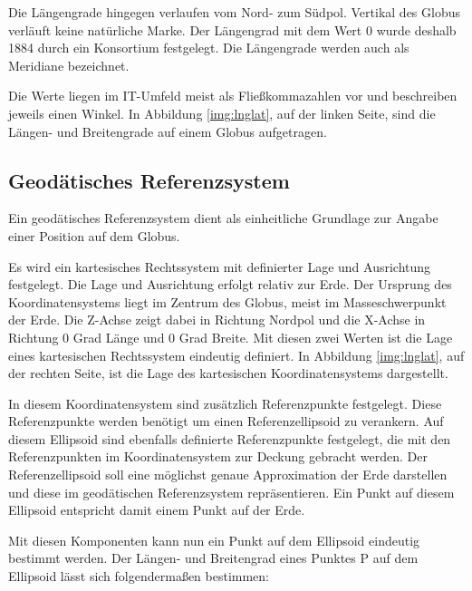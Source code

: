 			Die Längengrade hingegen verlaufen vom Nord- zum Südpol. 
			Vertikal des Globus verläuft keine natürliche Marke. 
			Der Längengrad mit dem Wert 0 wurde deshalb 1884 durch ein Konsortium festgelegt.
			Die Längengrade werden auch als Meridiane bezeichnet.
			
			Die Werte liegen im IT-Umfeld meist als Fließkommazahlen vor und beschreiben jeweils einen Winkel.
			In Abbildung \ref{img:lnglat}, auf der linken Seite, sind die Längen- und Breitengrade auf einem Globus aufgetragen.

		\subsection{Geodätisches Referenzsystem} 
			
			Ein geodätisches Referenzsystem dient als einheitliche Grundlage zur Angabe einer Position auf dem Globus. 

			Es wird ein kartesisches Rechtssystem mit definierter Lage und Ausrichtung festgelegt.
			Die Lage und Ausrichtung erfolgt relativ zur Erde. 
			Der Ursprung des Koordinatensystems liegt im Zentrum des Globus, meist im Masseschwerpunkt der Erde.
			Die Z-Achse zeigt dabei in Richtung Nordpol und die X-Achse in Richtung 0 Grad Länge und 0 Grad Breite. 
			Mit diesen zwei Werten ist die Lage eines kartesischen Rechtssystem eindeutig definiert.
			In Abbildung \ref{img:lnglat}, auf der rechten Seite, ist die Lage des kartesischen Koordinatensystems dargestellt.

			In diesem Koordinatensystem sind zusätzlich Referenzpunkte festgelegt.
			Diese Referenzpunkte werden benötigt um einen Referenzellipsoid zu verankern. 
			Auf diesem Ellipsoid sind ebenfalls definierte Referenzpunkte festgelegt, die mit den Referenzpunkten im Koordinatensystem zur Deckung gebracht werden.
			Der Referenzellipsoid soll eine möglichst genaue Approximation der Erde darstellen und diese im geodätischen Referenzsystem repräsentieren. 
			Ein Punkt auf diesem Ellipsoid entspricht damit einem Punkt auf der Erde.

			Mit diesen Komponenten kann nun ein Punkt auf dem Ellipsoid eindeutig bestimmt werden.
			Der Längen- und Breitengrad eines Punktes P auf dem Ellipsoid lässt sich folgendermaßen bestimmen:

